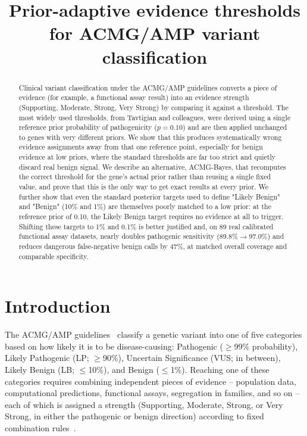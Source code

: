 \documentclass[11pt]{article}
\title{\textbf{Prior-adaptive evidence thresholds for ACMG/AMP variant classification}}
\author{}
\date{}
\begin{document}
\maketitle

\begin{abstract}
\noindent
Clinical variant classification under the ACMG/AMP guidelines converts a
piece of evidence (for example, a functional assay result) into an evidence
strength (Supporting, Moderate, Strong, Very Strong) by comparing it against
a threshold. The most widely used thresholds, from Tavtigian and colleagues,
were derived using a single reference prior probability of pathogenicity
($p=0.10$) and are then applied unchanged to genes with very different
priors. We show that this produces systematically wrong evidence
assignments away from that one reference point, especially for benign
evidence at low priors, where the standard thresholds are far too strict
and quietly discard real benign signal. We describe an alternative,
ACMG-Bayes, that recomputes the correct threshold for the gene's actual
prior rather than reusing a single fixed value, and prove that this is the
only way to get exact results at every prior. We further show that even the
standard posterior targets used to define "Likely Benign" and "Benign"
(10\% and 1\%) are themselves poorly matched to a low prior: at the
reference prior of 0.10, the Likely Benign target requires no evidence at
all to trigger. Shifting these targets to 1\% and 0.1\% is better justified
and, on 89 real calibrated functional assay datasets, nearly doubles
pathogenic sensitivity (89.8\%$\to$97.0\%) and reduces dangerous
false-negative benign calls by 47\%, at matched overall coverage and
comparable specificity.
\end{abstract}

\section*{Introduction}

The ACMG/AMP guidelines~\cite{richards2015standards} classify a genetic
variant into one of five categories based on how likely it is to be
disease-causing: Pathogenic ($\geq$99\% probability), Likely Pathogenic
(LP; $\geq$90\%), Uncertain Significance (VUS; in between), Likely Benign
(LB; $\leq$10\%), and Benign ($\leq$1\%). Reaching one of these categories
requires combining independent pieces of evidence -- population data,
computational predictions, functional assays, segregation in families, and
so on -- each of which is assigned a strength (Supporting, Moderate, Strong,
or Very Strong, in either the pathogenic or benign direction) according to
fixed combination rules~\cite{richards2015standards}.
\end{document}

